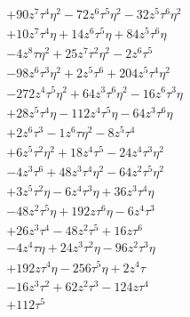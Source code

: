 {\begin{align*}
&+90z^{7}\tau^{4}\eta^{2}-72z^{6}\tau^{5}\eta^{2}-32z^{5}\tau^{6}\eta^{2}\\
&+10z^{7}\tau^{4}\eta+14z^{6}\tau^{5}\eta+84z^{5}\tau^{6}\eta\\
&-4z^{8}\tau\eta^{2}+25z^{7}\tau^{2}\eta^{2}-2z^{6}\tau^{5}\\
&-98z^{6}\tau^{3}\eta^{2}+2z^{5}\tau^{6}+204z^{5}\tau^{4}\eta^{2}\\
&-272z^{4}\tau^{5}\eta^{2}+64z^{3}\tau^{6}\eta^{2}-16z^{6}\tau^{3}\eta\\
&+28z^{5}\tau^{4}\eta-112z^{4}\tau^{5}\eta-64z^{3}\tau^{6}\eta\\
&+2z^{6}\tau^{3}-1z^{6}\tau\eta^{2}-8z^{5}\tau^{4}\\
&+6z^{5}\tau^{2}\eta^{2}+18z^{4}\tau^{5}-24z^{4}\tau^{3}\eta^{2}\\
&-4z^{3}\tau^{6}+48z^{3}\tau^{4}\eta^{2}-64z^{2}\tau^{5}\eta^{2}\\
&+3z^{5}\tau^{2}\eta-6z^{4}\tau^{3}\eta+36z^{3}\tau^{4}\eta\\
&-48z^{2}\tau^{5}\eta+192z\tau^{6}\eta-6z^{4}\tau^{3}\\
&+26z^{3}\tau^{4}-48z^{2}\tau^{5}+16z\tau^{6}\\
&-4z^{4}\tau\eta+24z^{3}\tau^{2}\eta-96z^{2}\tau^{3}\eta\\
&+192z\tau^{4}\eta-256\tau^{5}\eta+2z^{4}\tau\\
&-16z^{3}\tau^{2}+62z^{2}\tau^{3}-124z\tau^{4}\\
&+112\tau^{5}
\end{align*}
}

